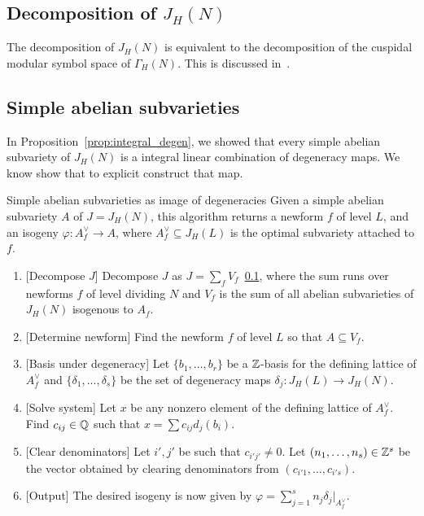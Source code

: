 \subsection{Decomposition of $J_H(N)$}%
\label{sub:decomposition_of_j_}

The decomposition of $J_H(N)$ is equivalent to the decomposition of the
cuspidal modular symbol space of $\Gamma_H(N)$. This is discussed in~\cite[\S
9]{stein:modform}.

\subsection{Simple abelian subvarieties}%
\label{sub:simple_abelian_subvarieties}

In Proposition~\ref{prop:integral_degen}, we showed that every simple abelian
subvariety of $J_H(N)$ is a integral linear combination of degeneracy maps. We
know show that to explicit construct that map.

\begin{algorithm}{Simple abelian subvarieties as image of degeneracies}%
    \label{alg:simple_degen}
    Given a simple abelian subvariety $A$ of $J=J_H(N)$, this algorithm returns
    a newform $f$ of level $L$, and an isogeny $\varphi:A_f ^\vee\to A$, where
    $A_f ^\vee\subseteq J_H(L)$ is the optimal subvariety attached to $f$.
    \begin{enumerate}
        \item{} [Decompose $J$]
            Decompose $J$ as $J=\sum_f V_f$~\ref{sub:decomposition_of_j_},
            where the sum runs over newforms $f$ of level dividing $N$ and
            $V_f$ is the sum of all abelian subvarieties of $J_H(N)$ isogenous
            to $A_f$.
        \item{} [Determine newform]
            Find the newform $f$ of level $L$ so that $A\subseteq V_f$.
        \item{} [Basis under degeneracy]
            Let $\{b_1,\ldots,b_r\}$ be a $\mathbb{Z}$-basis for the defining lattice
            of $A_f^\vee$ and $\{\delta_1,\ldots,\delta_s\}$ be the set of degeneracy
            maps $\delta_j:J_H(L)\to J_H(N)$.
        \item{} [Solve system]
            Let $x$ be any nonzero element of the defining lattice of
            $A_f^\vee$. Find $c_{ij}\in \mathbb{Q}$ such that $x=\sum c_{ij}
            d_j(b_i)$.
        \item{} [Clear denominators]
            Let $i', j'$ be such that $c_{i'j'}\neq 0$. Let
            $(n_1,\ldots,n_s)\in \mathbb{Z}^s$ be the vector obtained by
            clearing denominators from $(c_{i'1},\ldots,c_{i's})$.
        \item{} [Output]
            The desired isogeny is now given by $\varphi=\sum_{j=1} ^s n_j
            \delta_j|_{A_f ^\vee}$.
    \end{enumerate}
\end{algorithm}

